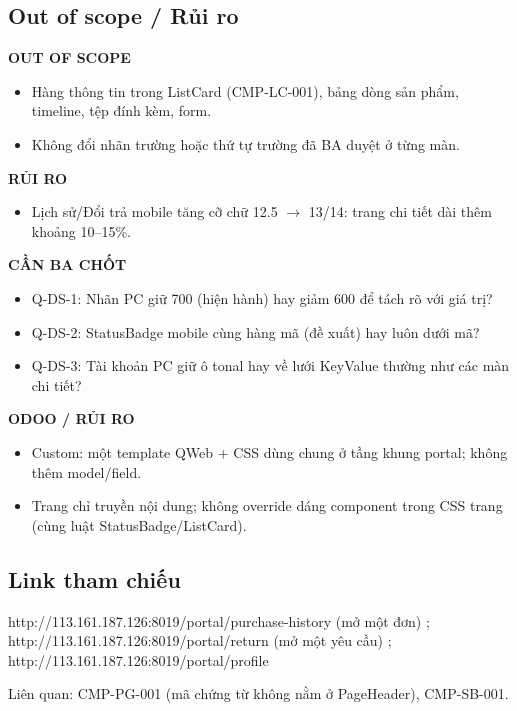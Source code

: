 \documentclass[11pt,a4paper]{report}
\begin{document}
\subsection*{Out of scope / Rủi ro}
\par\smallskip\textbf{OUT OF SCOPE}\par
\begin{itemize}
\item Hàng thông tin trong ListCard (CMP-LC-001), bảng dòng sản phẩm, timeline, tệp đính kèm, form.
\item Không đổi nhãn trường hoặc thứ tự trường đã BA duyệt ở từng màn.
\end{itemize}

\par\smallskip\textbf{RỦI RO}\par
\begin{itemize}
\item Lịch sử/\allowbreak{}Đổi trả mobile tăng cỡ chữ 12.5 \(\to\) 13/\allowbreak{}14: trang chi tiết dài thêm khoảng 10–15\%.
\end{itemize}

\par\smallskip\textbf{CẦN BA CHỐT}\par
\begin{itemize}
\item Q-DS-1: Nhãn PC giữ 700 (hiện hành) hay giảm 600 để tách rõ với giá trị?
\item Q-DS-2: StatusBadge mobile cùng hàng mã (đề xuất) hay luôn dưới mã?
\item Q-DS-3: Tài khoản PC giữ ô tonal hay về lưới KeyValue thường như các màn chi tiết?
\end{itemize}

\par\smallskip\textbf{ODOO / RỦI RO}\par
\begin{itemize}
\item Custom: một template QWeb + CSS dùng chung ở tầng khung portal; không thêm model/\allowbreak{}field.
\item Trang chỉ truyền nội dung; không override dáng component trong CSS trang (cùng luật StatusBadge/\allowbreak{}ListCard).
\end{itemize}
\subsection*{Link tham chiếu}
http://113.161.187.126:8019/\allowbreak{}portal/\allowbreak{}purchase-\allowbreak{}history (mở một đơn) ; http://113.161.187.126:8019/\allowbreak{}portal/\allowbreak{}return (mở một yêu cầu) ; http://113.161.187.126:8019/\allowbreak{}portal/\allowbreak{}profile\par
Liên quan: CMP-PG-001 (mã chứng từ không nằm ở PageHeader), CMP-SB-001.\par
\clearpage
\end{document}

